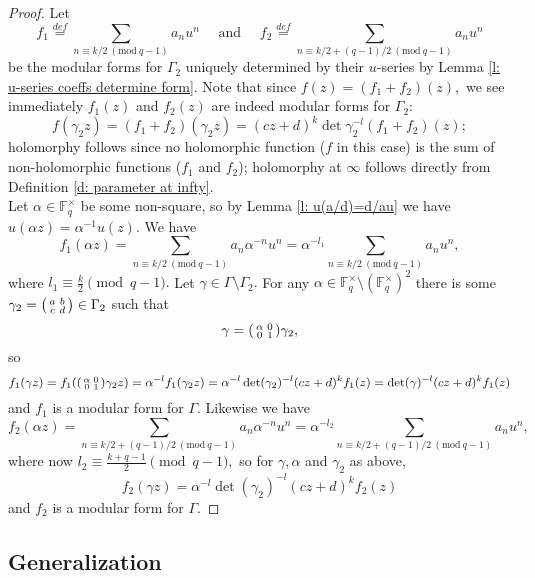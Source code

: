 \documentclass[11pt]{amsart}
\theoremstyle{definition}
\newenvironment{psmallmatrix}
{\left(\begin{smallmatrix}}
	{\end{smallmatrix}\right)}
\numberwithin{equation}{section}
\newcommand{\bbF}{\mathbb{F}}		%
\newcommand{\Mod}[1]{\ (\mathrm{mod}\ #1)}
\begin{document}
\begin{proof}
Let \[f_1\overset{def}{=}\sum_{n\equiv k/2\Mod{q-1}}a_nu^n\quad \text{ and }\quad f_2\overset{def}{=}\sum_{n\equiv k/2+(q-1)/2\Mod{q-1}} a_nu^n\] be the modular forms for $\Gamma_2$ uniquely determined by their $u$-series by Lemma \ref{l: u-series coeffs determine form}. Note that since $f(z)=(f_1+f_2)(z),$ we see immediately $f_1(z)$ and $f_2(z)$ are indeed modular forms for $\Gamma_2$: \[f(\gamma_2z)=(f_1+f_2)(\gamma_2 z)=(cz+d)^k\det\gamma_2^{-l}(f_1+f_2)(z);\] holomorphy follows since no holomorphic function ($f$ in this case) is the sum of non-holomorphic functions ($f_1$ and $f_2$); holomorphy at $\infty$ follows directly from Definition \ref{d: parameter at infty}.\\

Let $\alpha\in \bbF_q^{\times}$ be some non-square, so by Lemma \ref{l: u(a/d)=d/au} we have $u(\alpha z)=\alpha^{-1}u(z).$ We have \[f_1(\alpha z)=\sum_{n\equiv k/2\Mod{q-1}}a_n\alpha^{-n}u^n=\alpha^{-l_1}\sum_{n\equiv k/2\Mod{q-1}}a_nu^n,\] where $\displaystyle{l_1\equiv \frac{k}{2}\pmod{q-1}}.$ Let $\gamma\in \Gamma\setminus \Gamma_2.$ For any $\alpha\in \bbF_q^{\times}\setminus(\bbF_q^{\times})^2$ there is some $\displaystyle{\gamma_2=\begin{psmallmatrix}a&b\\c&d\end{psmallmatrix}\in \Gamma_2}$ such that \[\gamma=\begin{psmallmatrix}\alpha&0\\0&1\end{psmallmatrix}\gamma_2,\] so 
\[f_1(\gamma z)=f_1(\begin{psmallmatrix}\alpha&0\\0&1\end{psmallmatrix}\gamma_2 z)=\alpha^{-l}f_1(\gamma_2 z)=\alpha^{-l}\det(\gamma_2)^{-l}(cz+d)^kf_1(z)=\det(\gamma)^{-l}(cz+d)^kf_1(z)\] and $f_1$ is a modular form for $\Gamma.$ Likewise we have 
\[f_2(\alpha z)=\sum_{n\equiv k/2+(q-1)/2\Mod{q-1}} a_n\alpha^{-n}u^n=\alpha^{-l_2}\sum_{n\equiv k/2+(q-1)/2\Mod{q-1}} a_nu^n,\]
where now $\displaystyle{l_2\equiv \frac{k+q-1}{2}}\pmod{q-1},$ so for $\gamma,\alpha$ and $\gamma_2$ as above,
\[f_2(\gamma z)=\alpha^{-l}\det(\gamma_2)^{-l}(cz+d)^kf_2(z)\] and $f_2$ is a modular form for $\Gamma.$
\end{proof}


\subsection{Generalization}
\end{document}
